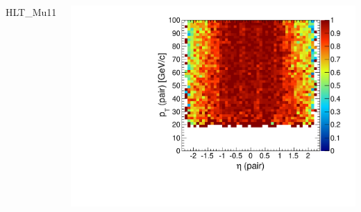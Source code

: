 \documentclass[compress]{beamer}
\begin{document}
\begin{frame}
\begin{columns}
\centering HLT\_Mu11

\includegraphics[width=\linewidth]{pteta_mass10cut_pluscut_Mu11.pdf}
\end{columns}
\end{frame}

\end{document}
